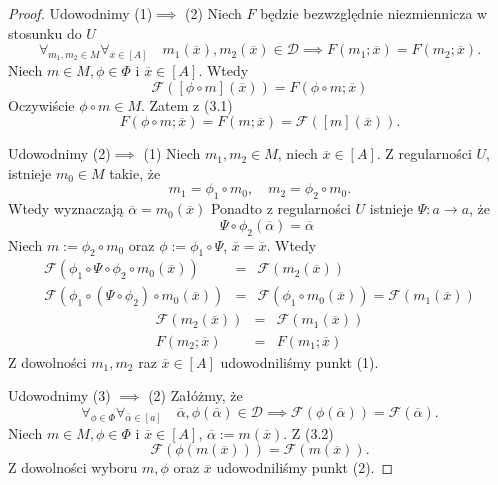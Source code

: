 \documentclass[12pt,a4paper]{report}
\newcommand{\domkniecie}[1]{\left\lbrack{#1}\right\rbrack}
\begin{document}
\begin{proof}
Udowodnimy (1)$\implies$ (2)
Niech $F$ będzie bezwzględnie niezmiennicza w stosunku do $U$
\begin{equation}
\forall_{m_{1}, m_{2} \in M}  \forall_{\overline{x} \in \domkniecie{A}} \quad m_1(\overline{x}), m_2(\overline{x})\in \mathcal{D} \implies F(m_{1};\overline{x})=F(m_{2};\overline{x}).
\end{equation}
Niech $m \in M, \phi \in \Phi$ i $\overline{x} \in \domkniecie{A}$. Wtedy
$$
\mathcal{F}(\domkniecie{\phi \circ m}(\overline{x}))=F(\phi \circ m;\overline{x})
$$
Oczywiście $\phi \circ m \in M$. Zatem z (3.1)
$$
F(\phi \circ m; \overline{x})=F(m;\overline{x})=\mathcal{F}(\domkniecie{m}(\overline{x})).
$$

Udowodnimy (2)$\implies$ (1)
Niech $m_1,m_2 \in M$, niech $\overline{x} \in\domkniecie{A}$.
Z regularności $U$, istnieje $m_0\in M$ takie, że
$$
m_1=\phi_1\circ m_0, \quad m_2=\phi_2\circ m_0.
$$
Wtedy wyznaczają $\overline{\alpha}=m_0(\overline{x})$
Ponadto z regularności $U$ istnieje $\Psi:a\to a$, że
$$
\quad \Psi\circ \phi_2(\overline{\alpha})=\overline{\alpha}
$$
Niech $m:=\phi_2\circ m_0$ oraz $\phi:=\phi_1\circ\Psi$, $\overline{x}=\overline{x}$. Wtedy
\begin{eqnarray*}
\mathcal{F}(\phi_1\circ \Psi\circ \phi_2 \circ m_0(\overline{x})) & = & \mathcal{F}(m_2(\overline{x})) \\
\mathcal{F}(\phi_1\circ(\Psi\circ \phi_2)\circ m_0(\overline{x})) & = & \mathcal{F}(\phi_1\circ m_0(\overline{x})) = \mathcal{F}(m_1(\overline{x}))
\end{eqnarray*}
\begin{eqnarray*}
\mathcal{F}(m_2(\overline{x})) & = & \mathcal{F}(m_1(\overline{x}))\\
F(m_2;\overline{x}) & = & F(m_1;\overline{x})
\end{eqnarray*}
Z dowolności $m_1,m_2$ raz $\overline{x} \in \domkniecie{A}$ udowodniliśmy punkt (1).

Udowodnimy (3) $\implies$ (2)
Załóżmy, że
\begin{equation}
\forall_{\phi \in \Phi} \forall_{\overline{\alpha} \in \domkniecie{a}} \quad \overline{\alpha}, \phi(\overline{\alpha})\in \mathcal{D} \implies \mathcal{F}(\phi(\overline{\alpha}))=\mathcal{F}(\overline{\alpha}).
\end{equation}
Niech $m\in M, \phi \in \Phi$ i $\overline{x} \in\domkniecie{A}$, $\overline{\alpha}:=m(\overline{x})$. Z (3.2)
$$
 \mathcal{F}(\phi(m(\overline{x})))=\mathcal{F}(m(\overline{x})).
$$
Z dowolności wyboru $m, \phi$ oraz $\overline{x}$ udowodniliśmy punkt (2).


\end{proof}
\end{document}

